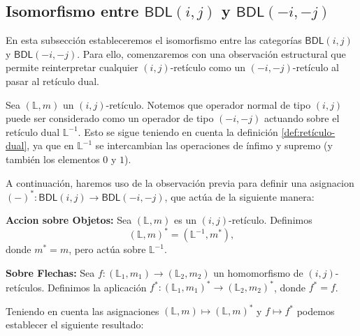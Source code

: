 \documentclass[12pt]{book}
\newcommand{\BDL}{\mathsf{BDL}}
\begin{document}
\subsection{Isomorfismo entre $\BDL(i, j)$ y $\BDL(-i,-j)$} \label{S3.2}

En esta subsección estableceremos el isomorfismo entre las categorías $\BDL(i,j)$ y $\BDL(-i,-j)$. Para ello, comenzaremos con una observación estructural que permite reinterpretar cualquier $(i,j)$-retículo como un $(-i,-j)$-retículo al pasar al retículo dual.

Sea $(\mathbb{L},m)$ un $(i,j)$-retículo. Notemos que operador normal de tipo \((i,j)\) puede ser considerado como un operador de tipo \((-i,-j)\) actuando sobre el retículo dual \(\mathbb{L}^{-1}\). Esto se sigue teniendo en cuenta la definición \ref{def:retículo-dual}, ya que en \(\mathbb{L}^{-1}\) se intercambian las operaciones de ínfimo y supremo (y también los elementos \(0\) y \(1\)). 


\vspace{0.2cm}

 
A continuación, haremos uso de la observación previa para definir una asignacion $(-)^{*} \colon \BDL(i,j) \to \BDL(-i,-j)$, que actúa de la siguiente manera:

\vspace{0.2cm}

\noindent \textbf{Accion sobre Objetos:} Sea $(\mathbb{L},m)$ es un $(i,j)$-retículo. Definimos
\[ \left( \mathbb{L},m \right)^{*} = \left(\mathbb{L}^{-1},m^{*}\right), \]
donde $m^{*} = m$, pero actúa sobre $\mathbb{L}^{-1}$.

\vspace{0.2cm}

\noindent \textbf{Sobre Flechas:} Sea $f \colon (\mathbb{L}_{1},m_{1}) \to (\mathbb{L}_{2},m_{2})$ un homomorfismo de $(i,j)$-retículos. Definimos la aplicación $f^{*} \colon (\mathbb{L}_{1},m_{1})^{*} \to (\mathbb{L}_{2},m_{2})^{*}$, donde $f^{*} = f$.

\vspace{0.2cm}

Teniendo en cuenta las asignaciones $(\mathbb{L},m) \mapsto (\mathbb{L},m)^{*}$ y $f \mapsto f^{*}$ podemos establecer el siguiente resultado:
\end{document}
